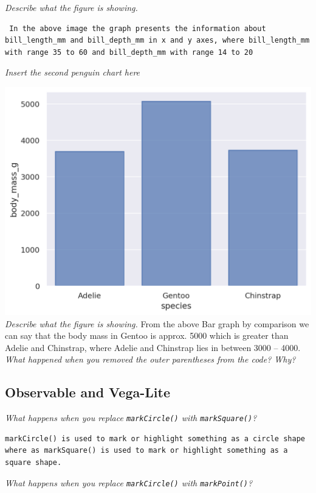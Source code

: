 \documentclass[
]{article}
\begin{document}
\emph{Describe what the figure is showing.}

\begin{verbatim}
 In the above image the graph presents the information about bill_length_mm and bill_depth_mm in x and y axes, where bill_length_mm with range 35 to 60 and bill_depth_mm with range 14 to 20
\end{verbatim}

\emph{Insert the second penguin chart here}

\includegraphics{2.png} \emph{Describe what the figure is showing.} From
the above Bar graph by comparison we can say that the body mass in
Gentoo is approx. 5000 which is greater than Adelie and Chinstrap, where
Adelie and Chinstrap lies in between 3000 -- 4000. \emph{What happened
when you removed the outer parentheses from the code? Why?}

\hypertarget{observable-and-vega-lite}{%
\subsection{Observable and Vega-Lite}\label{observable-and-vega-lite}}

\emph{What happens when you replace \texttt{markCircle()} with
\texttt{markSquare()}?}

\begin{verbatim}
markCircle() is used to mark or highlight something as a circle shape where as markSquare() is used to mark or highlight something as a square shape.
\end{verbatim}

\emph{What happens when you replace \texttt{markCircle()} with
\texttt{markPoint()}?}
\end{document}
